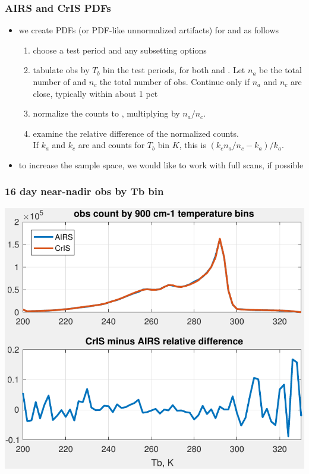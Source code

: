 \documentclass[11pt]{beamer}
\begin{document}
\begin{frame}
\frametitle{AIRS and CrIS PDFs}
\begin{itemize}

  \item we create PDFs (or PDF-like unnormalized artifacts) for
    {\airs} and {\cris} as follows

\begin{enumerate}
  \item choose a test period and any subsetting options

  \item tabulate obs by $T_b$ bin the test periods, for both {\airs}
    and {\cris}.  Let $n_a$ be the total number of {\airs} and $n_c$
    the total number of {\cris} obs.  Continue only if $n_a$ and
    $n_c$ are close, typically within about 1 pct

  \item normalize the {\cris} counts to {\airs}, multiplying by
    $n_a/n_c$.

  \item examine the relative difference of the normalized counts.  \\
    If $k_a$ and $k_c$ are {\airs} and {\cris} counts for $T_b$ bin
    $K$, this is $( k_c n_a/n_c - k_a) / k_a$.
\end{enumerate}

  \item to increase the sample space, we would like to work with
    full scans, if possible

\end{itemize}
\end{frame}
\begin{frame}
\frametitle{16 day near-nadir obs by Tb bin}
\begin{center}
  \includegraphics[scale=0.7]{figures/plot_tbin_test_11.pdf}
\end{center}
\end{frame} %
\end{document}

